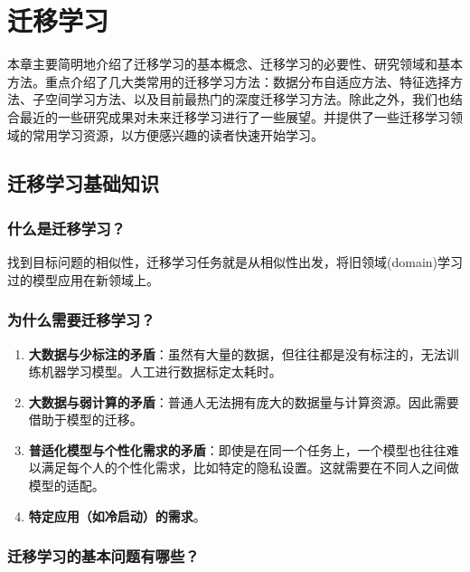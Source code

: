 \chapter{迁移学习}\label{ux7b2cux5341ux4e00ux7ae0-ux8fc1ux79fbux5b66ux4e60}

​
本章主要简明地介绍了迁移学习的基本概念、迁移学习的必要性、研究领域和基本方法。重点介绍了几大类常用的迁移学习方法：数据分布自适应方法、特征选择方法、子空间学习方法、以及目前最热门的深度迁移学习方法。除此之外，我们也结合最近的一些研究成果对未来迁移学习进行了一些展望。并提供了一些迁移学习领域的常用学习资源，以方便感兴趣的读者快速开始学习。

\section{迁移学习基础知识}\label{ux8fc1ux79fbux5b66ux4e60ux57faux7840ux77e5ux8bc6}

\subsection{什么是迁移学习？}\label{ux4ec0ux4e48ux662fux8fc1ux79fbux5b66ux4e60}

找到目标问题的相似性，迁移学习任务就是从相似性出发，将旧领域(domain)学习过的模型应用在新领域上。

\subsection{为什么需要迁移学习？}\label{ux4e3aux4ec0ux4e48ux9700ux8981ux8fc1ux79fbux5b66ux4e60}

\begin{enumerate}
\def\labelenumi{\arabic{enumi}.}
\tightlist
\item
  \textbf{大数据与少标注的矛盾}：虽然有大量的数据，但往往都是没有标注的，无法训练机器学习模型。人工进行数据标定太耗时。
\item
  \textbf{大数据与弱计算的矛盾}：普通人无法拥有庞大的数据量与计算资源。因此需要借助于模型的迁移。
\item
  \textbf{普适化模型与个性化需求的矛盾}：即使是在同一个任务上，一个模型也往往难以满足每个人的个性化需求，比如特定的隐私设置。这就需要在不同人之间做模型的适配。
\item
  \textbf{特定应用（如冷启动）的需求}。
\end{enumerate}

\subsection{迁移学习的基本问题有哪些？}\label{ux8fc1ux79fbux5b66ux4e60ux7684ux57faux672cux95eeux9898ux6709ux54eaux4e9b}

